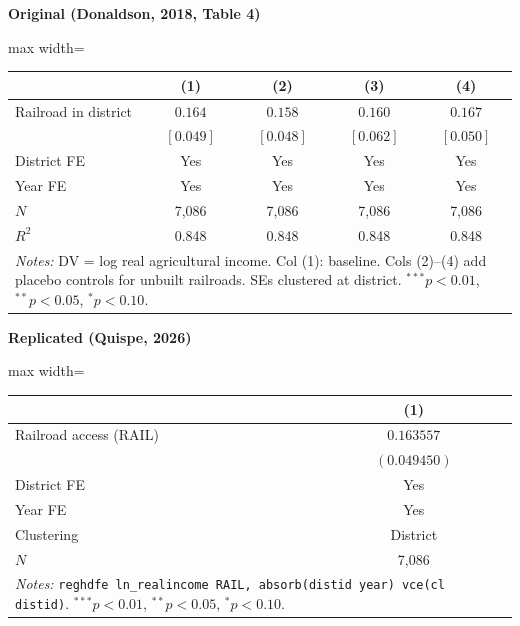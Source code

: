 \documentclass[11pt,a4paper]{article}
\begin{document}
\vspace{0.5cm}
\begin{minipage}[t]{0.48\textwidth}
\centering
\textbf{\large Original (Donaldson, 2018, Table 4)}
\vspace{0.3cm}

\begin{adjustbox}{max width=\textwidth}
\begin{tabular}{lcccc}
\toprule
 & (1) & (2) & (3) & (4) \\
\midrule
Railroad in district & $0.164$ & $0.158$ & $0.160$ & $0.167$ \\
 & $[0.049]$ & $[0.048]$ & $[0.062]$ & $[0.050]$ \\[0.3em]
\midrule
District FE & Yes & Yes & Yes & Yes \\
Year FE & Yes & Yes & Yes & Yes \\
$N$ & 7,086 & 7,086 & 7,086 & 7,086 \\
$R^2$ & 0.848 & 0.848 & 0.848 & 0.848 \\
\bottomrule
\multicolumn{5}{p{0.95\textwidth}}{\footnotesize\textit{Notes:} DV = log real agricultural income. Col (1): baseline. Cols (2)--(4) add placebo controls for unbuilt railroads. SEs clustered at district. $^{***}p<0.01$, $^{**}p<0.05$, $^{*}p<0.10$.}
\end{tabular}
\end{adjustbox}
\end{minipage}%
\hfill
\begin{minipage}[t]{0.48\textwidth}
\centering
\textbf{\large Replicated (Quispe, 2026)}
\vspace{0.3cm}

\begin{adjustbox}{max width=\textwidth}
\begin{tabular}{lc}
\toprule
 & (1) \\
\midrule
Railroad access (RAIL) & $0.163557$ \\
 & $(0.049450)$ \\[0.3em]
\midrule
District FE & Yes \\
Year FE & Yes \\
Clustering & District \\
$N$ & 7,086 \\
\bottomrule
\multicolumn{2}{p{0.95\textwidth}}{\footnotesize\textit{Notes:} \texttt{reghdfe ln\_realincome RAIL, absorb(distid year) vce(cl distid)}. $^{***}p<0.01$, $^{**}p<0.05$, $^{*}p<0.10$.}
\end{tabular}
\end{adjustbox}
\end{minipage}
\end{document}
